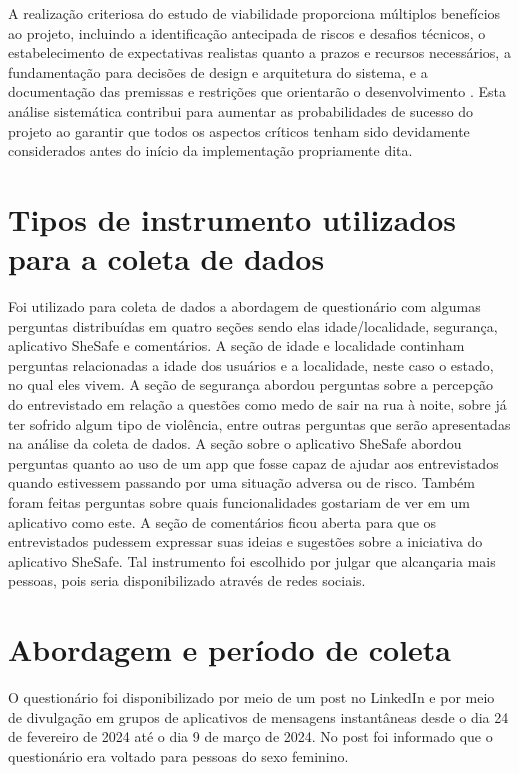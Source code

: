 A realização criteriosa do estudo de viabilidade proporciona múltiplos benefícios ao projeto, incluindo a identificação antecipada de riscos e desafios técnicos, o estabelecimento de expectativas realistas quanto a prazos e recursos necessários, a fundamentação para decisões de design e arquitetura do sistema, e a documentação das premissas e restrições que orientarão o desenvolvimento \cite{hughes2016project}. Esta análise sistemática contribui para aumentar as probabilidades de sucesso do projeto ao garantir que todos os aspectos críticos tenham sido devidamente considerados antes do início da implementação propriamente dita.

\section{Tipos de instrumento utilizados para a coleta de dados}
Foi utilizado para coleta de dados a abordagem de questionário com algumas perguntas distribuídas em quatro seções sendo elas idade/localidade, segurança, aplicativo SheSafe e comentários. 
A seção de idade e localidade continham perguntas relacionadas a idade dos usuários e a localidade, neste caso o estado, no qual eles vivem.
A seção de segurança abordou perguntas sobre a percepção do entrevistado em relação a questões como medo de sair na rua à noite, sobre já ter sofrido algum tipo de violência, entre outras perguntas que serão apresentadas na análise da coleta de dados.
A seção sobre o aplicativo SheSafe abordou perguntas quanto ao uso de um app que fosse capaz de ajudar aos entrevistados quando estivessem passando por uma situação adversa ou de risco. Também foram feitas perguntas sobre quais funcionalidades gostariam de ver em um aplicativo como este.
A seção de comentários ficou aberta para que os entrevistados pudessem expressar suas ideias e sugestões sobre a iniciativa do aplicativo SheSafe.
Tal instrumento foi escolhido por julgar que alcançaria mais pessoas, pois seria disponibilizado através de redes sociais.

\section{Abordagem e período de coleta}
O questionário foi disponibilizado por meio de um post no LinkedIn e por meio de divulgação em grupos de aplicativos de mensagens instantâneas desde o dia 24 de fevereiro de 2024 até o dia 9 de março de 2024. No post foi informado que o questionário era voltado para pessoas do sexo feminino.

